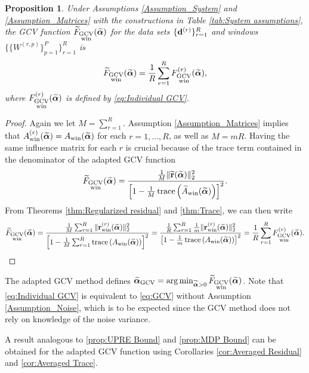 \documentclass[12pt]{article}
\newtheorem{proposition}{Proposition}[section]
\begin{document}
\begin{proposition}
\label{prop:Main GCV Result}
Under Assumptions \ref{Assumption_System} and \ref{Assumption_Matrices} with the constructions in Table \ref{tab:System assumptions}, the GCV function $\widetilde{F}_{\substack{\text{GCV} \\ \text{win}}}(\widetilde{\bm{\alpha}})$ for the data sets $\{\mathbf{d}^{(r)}\}_{r=1}^R$ and windows $\{\{W^{(r,p)}\}_{p=1}^P\}_{r=1}^R$ is
\begin{equation}
\label{eq:Averaged GCV}
\widetilde{F}_{\substack{\text{GCV} \\ \text{win}}}(\widetilde{\bm{\alpha}}) = \frac{1}{R} \sum_{r=1}^R F_{\substack{\text{GCV} \\ \text{win}}}^{(r)}(\widetilde{\bm{\alpha}}),
\end{equation}
where $F_{\substack{\text{GCV} \\ \text{win}}}^{(r)}(\widetilde{\bm{\alpha}})$ is defined by \eqref{eq:Individual GCV}.
\end{proposition}
\begin{proof}
Again we let $M = \sum_{r=1}^{R}$. Assumption \ref{Assumption_Matrices} implies that $A_{\text{win}}^{(r)}(\widetilde{\bm{\alpha}}) = A_{\text{win}}(\widetilde{\bm{\alpha}})$ for each $r = 1,\ldots,R$, as well as $M = mR$. Having the same influence matrix for each $r$ is crucial because of the trace term contained in the denominator of the adapted GCV function
\begin{equation}
\label{eq:GCV Big}
\widetilde{F}_{\substack{\text{GCV} \\ \text{win}}}(\widetilde{\bm{\alpha}}) = \frac{\frac{1}{M}\|\widetilde{\mathbf{r}}(\widetilde{\bm{\alpha}})\|_2^2}{\left[1 - \frac{1}{M}\operatorname{trace}\left(\widetilde{A}_{\text{win}}(\widetilde{\bm{\alpha}})\right)\right]^2}.
\end{equation}
From Theorems \ref{thm:Regularized residual} and \ref{thm:Trace}, we can then write
\[\widetilde{F}_{\substack{\text{GCV} \\ \text{win}}}(\widetilde{\bm{\alpha}}) = \frac{\frac{1}{M}\sum_{r=1}^R \|\mathbf{r}_{\text{win}}^{(r)}(\widetilde{\bm{\alpha}})\|_2^2}{\left[1 - \frac{1}{M}\sum_{r=1}^R \operatorname{trace}\left(A_{\text{win}}(\widetilde{\bm{\alpha}})\right)\right]^2} = \frac{\frac{1}{R} \sum_{r=1}^R \frac{1}{m} \|\mathbf{r}_{\text{win}}^{(r)}(\widetilde{\bm{\alpha}})\|_2^2}{\left[1 - \frac{1}{m} \operatorname{trace}\left(A_{\text{win}}(\widetilde{\bm{\alpha}})\right)\right]^2} = \frac{1}{R}\sum_{r=1}^R F_{\substack{\text{GCV} \\ \text{win}}}^{(r)}(\widetilde{\bm{\alpha}}).\]
\end{proof}
\noindent The adapted GCV method defines $\widetilde{\bm{\alpha}}_{\textrm{GCV}} = \operatorname*{arg\,min}_{\widetilde{\bm{\alpha}} > 0} \widetilde{F}_{\substack{\text{GCV} \\ \text{win}}}(\widetilde{\bm{\alpha}})$. Note that \eqref{eq:Individual GCV} is equivalent to \eqref{eq:GCV} without Assumption \ref{Assumption_Noise}, which is to be expected since the GCV method does not rely on knowledge of the noise variance. \par 
A result analogous to \ref{prop:UPRE Bound} and \ref{prop:MDP Bound} can be obtained for the adapted GCV function using Corollaries \ref{cor:Averaged Residual} and \ref{cor:Averaged Trace}.
\end{document}
